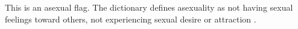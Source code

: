 {
This is an asexual flag.
}{
The dictionary defines asexuality as not having sexual feelings toward others, 
not experiencing sexual desire or attraction \cite{asexual-def}.
}
